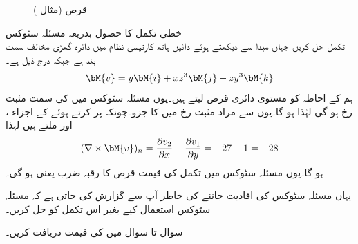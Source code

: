 % 
\begin{figure}
\centering
{}
\caption{قرص (مثال )}
\label{شکل_مثال_خطی_تکمل_گردش_مفہوم}
\end{figure}
\quad خطی تکمل کا حصول بذریعہ مسئلہ سٹوکس\\
تکمل  حل کریں جہاں مبدا سے دیکھتے ہوئے  دائیں ہاتھ کارتیسی نظام میں دائرہ   گھڑی مخالف سمت بند ہے جبکہ  درج ذیل ہے۔
\begin{align*}
\bM{v}=y\bM{i}+xz^3\bM{j}-zy^3\bM{k}
\end{align*}
ہم  کے احاطہ  کو مستوی دائری قرص  لیتے ہیں۔یوں مسئلہ سٹوکس میں  کی سمت مثبت  رخ ہو گی لہٰذا  ہو گا۔یوں  سے مراد مثبت  رخ میں  کا جزو۔چونکہ  پر کرتے ہوئے  کے اجزاء ،  اور  ملتے ہیں لہٰذا
\begin{align*}
(\nabla \times \bM{v})_n=\frac{\partial v_2}{\partial x}-\frac{\partial v_1}{\partial y}=-27-1=-28
\end{align*}
ہو گا۔یوں مسئلہ سٹوکس میں تکمل  کی قیمت قرص کا رقبہ   ضرب   یعنی  ہو گی۔

یہاں مسئلہ سٹوکس کی افادیت جاننے کی خاطر آپ سے گزارش کی جاتی ہے کہ مسئلہ سٹوکس استعمال کیے بغیر اس تکمل کو حل کریں۔

سوال  تا سوال  میں  کی قیمت دریافت کریں۔

